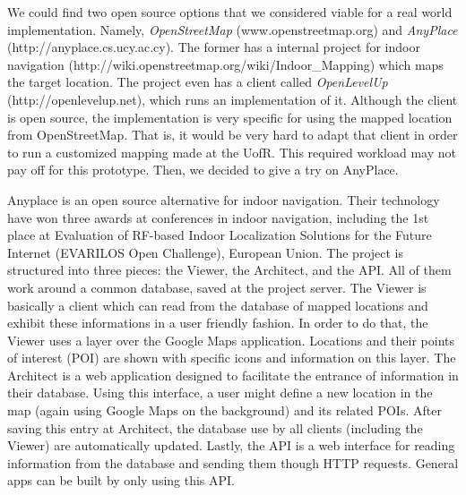 We could find two open source options that we considered viable for a real world implementation.
Namely, \emph{OpenStreetMap} (www.openstreetmap.org) and \emph{AnyPlace} (http://anyplace.cs.ucy.ac.cy).
The former has a internal project for indoor navigation (http://wiki.openstreetmap.org/wiki/Indoor\_Mapping) which maps the target location.
The project even has a client called \emph{OpenLevelUp} (http://openlevelup.net), which runs an implementation of it.
Although the client is open source, the implementation is very specific for using the mapped location from OpenStreetMap.
That is, it would be very hard to adapt that client in order to run a customized mapping made at the UofR.
This required workload may not pay off for this prototype.
Then, we decided to give a try on AnyPlace.

Anyplace \cite{zeinalipour:IEEEIC16} is an open source alternative for indoor navigation.
Their technology have won three awards at conferences in indoor navigation, including the 1st place at Evaluation of RF-based Indoor Localization Solutions for the Future Internet (EVARILOS Open Challenge), European Union.
The project is structured into three pieces: the Viewer, the Architect, and the API.
All of them work around a common database, saved at the project server.
The Viewer is basically a client which can read from the database of mapped locations and exhibit these informations in a user friendly fashion.
In order to do that, the Viewer uses a layer over the Google Maps application.
Locations and their points of interest (POI) are shown with specific icons and information on this layer.
The Architect is a web application designed to facilitate the entrance of information in their database.
Using this interface, a user might define a new location in the map (again using Google Maps on the background) and its related POIs.
After saving this entry at Architect, the database use by all clients (including the Viewer) are automatically updated.
Lastly, the API is a web interface for reading information from the database and sending them though HTTP requests.
General apps can be built by only using this API.

